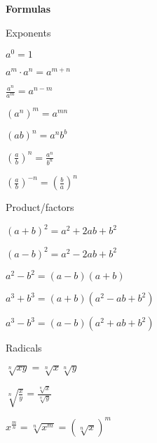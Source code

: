 \documentclass[12pt]{article}
\begin{document}
\begin{center}
  {\Large \bf Formulas}
\end{center}

\begin{multicols}{2}
  {\large Exponents}
  \begin{description}
  \item $a^0=1$
  \item $ a^m\cdot a^n = a^{m+n}$
  \item $ \frac{a^n}{a^m} = a^{n-m} $
  \item $ (a^n)^m = a^{mn} $
  \item $ (ab)^n = a^nb^b $
  \item $ \left( \frac{a}{b} \right)^n = \frac{a^n}{b^n}$
  \item $ \left(\frac{a}{b}\right)^{-n} = \left(\frac{b}{a}\right)^n $
  \end{description}
  \vspace{5em}
  
  {\large Product/factors}
  \begin{description}
  \item $(a+b)^2 = a^2 + 2ab + b^2$
  \item $(a-b)^2 = a^2 - 2ab + b^2  $
  \item $ a^2 - b^2 = (a-b)(a+b) $
  \item $ a^3 + b^3 = (a+b)(a^2 - ab + b^2) $
  \item $ a^3 - b^3 = (a-b)(a^2 + ab + b^2) $
  \end{description}
  
  {\large Radicals}
  \begin{description}
  \item $ \sqrt[n]{xy} = \sqrt[n]{x}\sqrt[n]{y}$
  \item $\sqrt[n]{\frac{x}{y}} = \frac{\sqrt[n]{x}}{\sqrt[n]{y}}$
  \item $ x^{\frac{m}{n}} = \sqrt[n]{x^m} = (\sqrt[n]{x})^m $
  \end{description}
  
\end{multicols}
\end{document}

